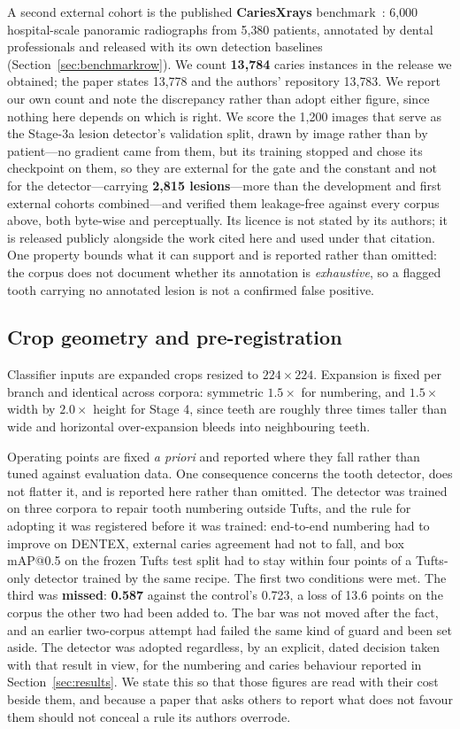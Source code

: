 \documentclass[conference]{IEEEtran}
\begin{document}
A second external cohort is the published \textbf{CariesXrays}
benchmark~\cite{chen2024cariesxrays}: 6{,}000 hospital-scale panoramic radiographs
from 5{,}380 patients, annotated by dental professionals and released with its own
detection baselines (Section~\ref{sec:benchmarkrow}). We count \textbf{13{,}784}
caries instances in the release we obtained; the paper states 13{,}778 and the
authors' repository 13{,}783. We report our own count and note the discrepancy
rather than adopt either figure, since nothing here depends on which is right. We score the 1{,}200 images
that serve as the Stage-3a lesion detector's validation split, drawn by image
rather than by patient---no gradient came
from them, but its training stopped and chose its checkpoint on them, so they are
external for the gate and the constant and not for the detector---carrying
\textbf{2{,}815 lesions}---more than the development and first external cohorts combined---and
verified them leakage-free against every corpus above, both byte-wise and
perceptually. Its licence is not stated by its authors;
it is released publicly alongside the work cited here and used under that
citation. One property bounds what it can support and is reported rather than
omitted: the corpus does not document whether its annotation is
\emph{exhaustive}, so a flagged tooth carrying no annotated lesion is not a
confirmed false positive.

\subsection{Crop geometry and pre-registration}
Classifier inputs are expanded crops resized to $224\times224$. Expansion is
fixed per branch and identical across corpora: symmetric $1.5\times$ for
numbering, and $1.5\times$ width by $2.0\times$ height for Stage 4, since teeth
are roughly three times taller than wide and horizontal over-expansion bleeds
into neighbouring teeth.

Operating points are fixed \emph{a priori} and reported where they fall rather
than tuned against evaluation data. One consequence concerns the tooth detector,
does not flatter it, and is reported here rather than omitted. The detector was
trained on three corpora to repair tooth numbering outside Tufts, and the rule
for adopting it was registered before it was trained: end-to-end numbering had to
improve on DENTEX, external caries agreement had not to fall, and box mAP@0.5 on
the frozen Tufts test split had to stay within four points of a Tufts-only
detector trained by the same recipe. The first two conditions were met. The third
was \textbf{missed}: \textbf{0.587} against the control's 0.723, a loss of 13.6
points on the corpus the other two had been added to. The bar was not moved after
the fact, and an earlier two-corpus attempt had failed the same kind of guard and
been set aside. The detector was adopted regardless, by an explicit, dated
decision taken with that result in view, for the numbering and caries behaviour
reported in Section~\ref{sec:results}. We state this so that those figures are
read with their cost beside them, and because a paper that asks others to report
what does not favour them should not conceal a rule its authors overrode.
\end{document}
